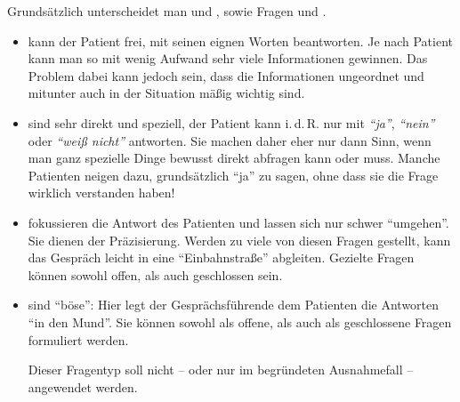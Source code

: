 {
Grundsätzlich unterscheidet man  und
, sowie  Fragen und
.

\begin{itemize}
  \item {} kann der Patient frei, mit
  seinen eignen Worten beantworten. Je nach Patient kann man so
  mit wenig Aufwand sehr viele Informationen gewinnen. Das
  Problem dabei kann jedoch sein, dass die Informationen
  ungeordnet und mitunter auch in der Situation mäßig wichtig
  sind.
  
  \begin{quote}
    
  \end{quote}
  
  
  \item {} sind sehr direkt und
  speziell, der Patient kann i.\,d.\,R. nur mit
  \emph{\enquote{ja}}, \emph{\enquote{nein}} oder
  \emph{\enquote{weiß nicht}} antworten. Sie machen daher
  eher nur dann Sinn, wenn man ganz spezielle Dinge bewusst
  direkt abfragen kann oder muss.  Manche
  Patienten neigen dazu, grundsätzlich \enquote{ja} zu
  sagen, ohne dass sie die Frage wirklich verstanden haben!
  
  \begin{quote}
    
  \end{quote}
  
  \item {} fokussieren die Antwort des
  Patienten und
  lassen sich nur schwer \enquote{umgehen}. Sie dienen der
  Präzisierung. Werden zu
  viele von diesen Fragen gestellt, kann das Gespräch leicht
  in eine \enquote{Einbahnstraße} abgleiten. Gezielte Fragen können
  sowohl offen, als auch geschlossen sein.
  \begin{quote}
  \end{quote}
  
  \item {} sind \enquote{böse}: Hier
  legt der Gesprächsführende dem Patienten die Antworten \enquote{in
  den Mund}. Sie können sowohl als offene, als auch als
  geschlossene Fragen formuliert werden.
  
  \begin{quote}
    
  \end{quote}
  
  Dieser Fragentyp soll nicht -- oder nur im begründeten
  Ausnahmefall -- angewendet werden.
\end{itemize}



}
